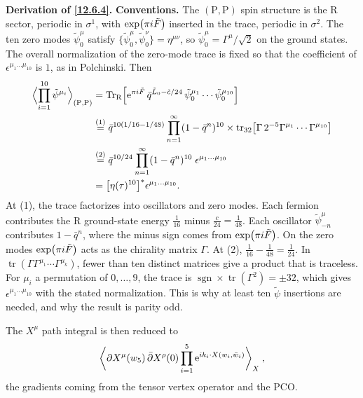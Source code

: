 \begin{tcolorbox}[breakable]
	\begin{remark}
		\textbf{Derivation of \eqref{12.6.4}.} \textbf{Conventions.} The $(\mathrm P,\mathrm P)$ spin structure is the R sector, periodic in $\sigma^{1}$, with $\exp(\pi i\tilde F)$ inserted in the trace, periodic in $\sigma^{2}$. The ten zero modes $\tilde\psi_{0}^{\mu}$ satisfy $\{\tilde\psi_{0}^{\mu},\tilde\psi_{0}^{\nu}\}=\eta^{\mu\nu}$, so $\tilde\psi_{0}^{\mu}=\Gamma^{\mu}/\sqrt2$ on the ground states. The overall normalization of the zero-mode trace is fixed so that the coefficient of $\epsilon^{\mu_{1}\dots\mu_{10}}$ is $1$, as in Polchinski. Then
		\begin{align*}
			\Bigl\langle\prod_{i=1}^{10}\tilde\psi^{\mu_{i}}\Bigr\rangle_{(\mathrm P,\mathrm P)}
			&=\operatorname{Tr}_{\mathrm R}\Bigl[\mathrm{e}^{\pi i\tilde F}\,\bar q^{\tilde L_{0}-\tilde c/24}\,\tilde\psi_{0}^{\mu_{1}}\cdots\tilde\psi_{0}^{\mu_{10}}\Bigr]\\
			&\overset{(1)}{=} \bar q^{10(1/16-1/48)}\prod_{n=1}^{\infty}(1-\bar q^{n})^{10}\times\operatorname{tr}_{32}\bigl[\Gamma\,2^{-5}\Gamma^{\mu_{1}}\cdots\Gamma^{\mu_{10}}\bigr]\\
			&\overset{(2)}{=} \bar q^{10/24}\prod_{n=1}^{\infty}(1-\bar q^{n})^{10}\;\epsilon^{\mu_{1}\dots\mu_{10}}\\
			&=\bigl[\eta(\tau)^{10}\bigr]^{*}\epsilon^{\mu_{1}\dots\mu_{10}} .
		\end{align*}
		At (1), the trace factorizes into oscillators and zero modes. Each fermion contributes the R ground-state energy $\frac1{16}$ minus $\frac{c}{24}=\frac1{48}$. Each oscillator $\tilde\psi^{\mu}_{-n}$ contributes $1-\bar q^{n}$, where the minus sign comes from $\exp(\pi i\tilde F)$. On the zero modes $\exp(\pi i\tilde F)$ acts as the chirality matrix $\Gamma$. At (2), $\frac1{16}-\frac1{48}=\frac1{24}$. In $\operatorname{tr}(\Gamma\Gamma^{\mu_{1}}\cdots\Gamma^{\mu_{k}})$, fewer than ten distinct matrices give a product that is traceless. For $\mu_{i}$ a permutation of $0,\dots,9$, the trace is $\operatorname{sgn}\times\operatorname{tr}(\Gamma^{2})=\pm32$, which gives $\epsilon^{\mu_{1}\dots\mu_{10}}$ with the stated normalization. This is why at least ten $\tilde\psi$ insertions are needed, and why the result is parity odd.
	\end{remark}
\end{tcolorbox}

\noindent The $X^\mu$ path integral is then reduced to
\begin{equation}
	\biggl\langle \partial X^\mu(w_5)\,\bar{\partial}X^\rho(0)\prod_{i=1}^{5}\mathrm{e}^{i k_i\cdot X(w_i,\bar{w}_i)}\biggr\rangle_X \:, \label{12.6.5}
\end{equation}
the gradients coming from the tensor vertex operator and the PCO.

